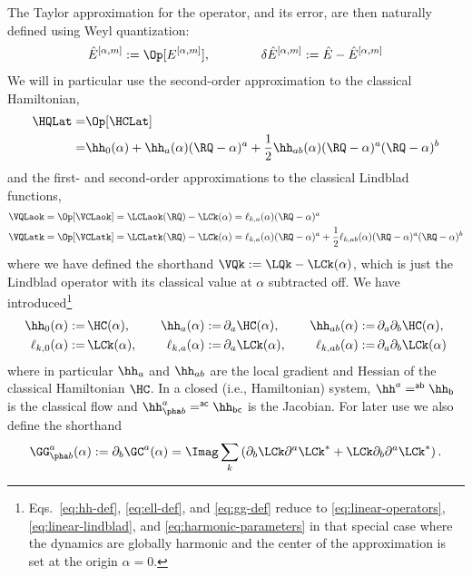 \documentclass{article}
\numberwithin{equation}{section}
\begin{document}
The Taylor approximation for the operator, and its error, are then naturally defined using Weyl quantization:
\begin{align}
	\hat{E}^{[\alpha,m]} := \Op[E^{[\alpha,m]}], \qquad \qquad \delta\hat{E}^{[\alpha,m]} := \hat{E}-\hat{E}^{[\alpha,m]}
\end{align}
We will in particular use the second-order approximation to the classical Hamiltonian,
\begin{align}
	\HQLat =& 
	\Op[\HCLat]\\
	=& \hh_0(\alpha) + \hh_a(\alpha) (\RQ-\alpha)^a + \frac{1}{2} \hh_{ab}(\alpha) (\RQ-\alpha)^a (\RQ-\alpha)^b
\end{align}
and the first- and second-order approximations to the classical Lindblad functions,
\begin{align}
	\VQLaok = \Op[\VCLaok] &= \LCLaok(\RQ) - \LCk(\alpha) = \ell_{k,a}(\alpha) (\RQ-\alpha)^a \\
	\VQLatk = \Op[\VCLatk] &= \LCLatk(\RQ) - \LCk(\alpha) = \ell_{k,a}(\alpha) (\RQ-\alpha)^a + \frac{1}{2} \ell_{k,ab}(\alpha) (\RQ-\alpha)^a (\RQ-\alpha)^b
\end{align}
where we have defined the shorthand $\VQk := \LQk-\LCk(\alpha)$, which is just the Lindblad operator with its classical value at $\alpha$ subtracted off.  We have introduced\footnote{Eqs.~\eqref{eq:hh-def}, \eqref{eq:ell-def}, and \eqref{eq:gg-def} reduce to \eqref{eq:linear-operators}, \eqref{eq:linear-lindblad}, and \eqref{eq:harmonic-parameters} in that special case where the dynamics are globally harmonic and the center of the approximation is set at the origin $\alpha=0$.}
\begin{align}
    \label{eq:hh-def}
    \hh_0(\alpha)  := &\, \HC(\alpha), & \quad \hh_a(\alpha)  := &\, \partial_a \HC(\alpha), & \quad \hh_{ab}(\alpha)  := &\, \partial_a\partial_b \HC(\alpha),\\
    \label{eq:ell-def}
    \ell_{k,0}(\alpha)  := &\,\LCk(\alpha), & \quad \ell_{k,a}(\alpha)  := &\, \partial_a \LCk(\alpha), & \quad \ell_{k,ab}(\alpha)  := &\, \partial_a \partial_b \LCk(\alpha)
\end{align}
where in particular $\hh_a$ and $\hh_{ab}$ are the local gradient and Hessian of the classical Hamiltonian $\HC$.
In a closed (i.e., Hamiltonian) system, $\hh^a = \sf^{ab}\hh_b$ is the classical flow and $\hh^a_{\pha b} = \sf^{ac}\hh_{bc}$ is the Jacobian.
For later use we also define the shorthand
\begin{align}
    \label{eq:gg-def}
    \GG^a_{\pha b}(\alpha) := \partial_b\GC^a(\alpha) =  \Imag \sum_k \left(\partial_b\LCk  \partial^a \LCk^* +\LCk  \partial_b\partial^a \LCk^*\right).
\end{align}
\end{document}
